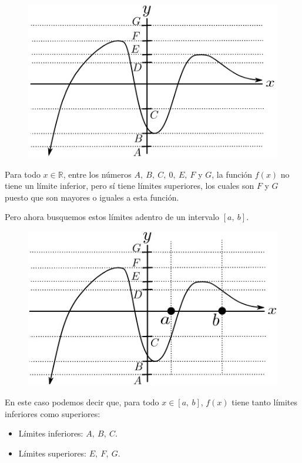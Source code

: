 \documentclass[12pt]{article}
\begin{document}
\newpage

\begin{figure}[hbt!]
\centering
\includegraphics[scale=0.6]{img/bounds-mvt.jpg}
\end{figure}

Para todo $x \in \mathbb{R}$, entre los números $A, \ B, \ C, \ 0, \ E, \ F$ y $G$, la función $f(x)$ no tiene un límite inferior, pero sí tiene límites superiores, los cuales son $F$ y $G$ puesto que son mayores o iguales a esta función.

Pero ahora busquemos estos límites adentro de un intervalo $[a, \ b]$.

\begin{figure}[hbt!]
\centering
\includegraphics[scale=0.6]{img/bounds-mvt-2.jpg}
\end{figure}

En este caso podemos decir que, para todo $x \in [a, \ b]$, $f(x)$ tiene tanto límites inferiores como superiores:

\begin{itemize}
\item Límites inferiores: $A, \ B, \ C$.
\item Límites superiores: $E, \ F, \ G$.
\end{itemize}
\end{document}
